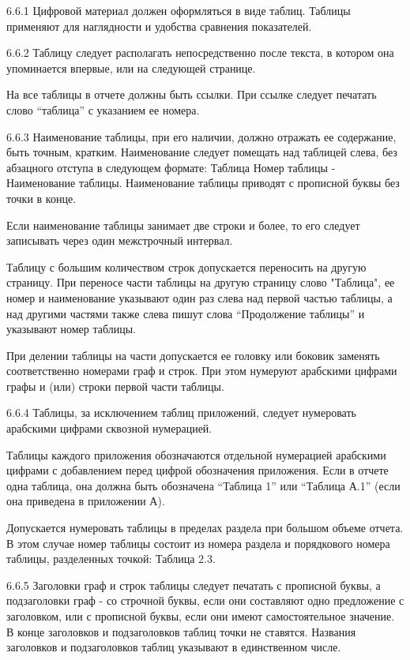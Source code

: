 6.6.1 Цифровой материал должен оформляться в виде таблиц. Таблицы применяют для
наглядности и удобства сравнения показателей.

6.6.2 Таблицу следует располагать непосредственно после текста, в котором она
упоминается впервые, или на следующей странице.

На все таблицы в отчете должны быть ссылки. При ссылке следует печатать слово
\enquote{таблица} с указанием ее номера.

6.6.3 Наименование таблицы, при его наличии, должно отражать ее содержание,
быть точным, кратким. Наименование следует помещать над таблицей слева, без
абзацного отступа в следующем формате: Таблица Номер таблицы - Наименование
таблицы. Наименование таблицы приводят с прописной буквы без точки в конце.

Если наименование таблицы занимает две строки и более, то его следует
записывать через один межстрочный интервал.

Таблицу с большим количеством строк допускается переносить на другую страницу.
При переносе части таблицы на другую страницу слово "Таблица", ее номер и
наименование указывают один раз слева над первой частью таблицы, а над другими
частями также слева пишут слова \enquote{Продолжение таблицы} и указывают номер
таблицы.

При делении таблицы на части допускается ее головку или боковик заменять
соответственно номерами граф и строк. При этом нумеруют арабскими цифрами графы
и (или) строки первой части таблицы.

6.6.4 Таблицы, за исключением таблиц приложений, следует нумеровать арабскими
цифрами сквозной нумерацией.

Таблицы каждого приложения обозначаются отдельной нумерацией арабскими цифрами
с добавлением перед цифрой обозначения приложения. Если в отчете одна таблица,
она должна быть обозначена \enquote{Таблица 1} или \enquote{Таблица А.1} (если она приведена в
приложении А).

Допускается нумеровать таблицы в пределах раздела при большом объеме отчета. В
этом случае номер таблицы состоит из номера раздела и порядкового номера
таблицы, разделенных точкой: Таблица 2.3.

6.6.5 Заголовки граф и строк таблицы следует печатать с прописной буквы, а
подзаголовки граф - со строчной буквы, если они составляют одно предложение с
заголовком, или с прописной буквы, если они имеют самостоятельное значение. В
конце заголовков и подзаголовков таблиц точки не ставятся. Названия заголовков
и подзаголовков таблиц указывают в единственном числе.

